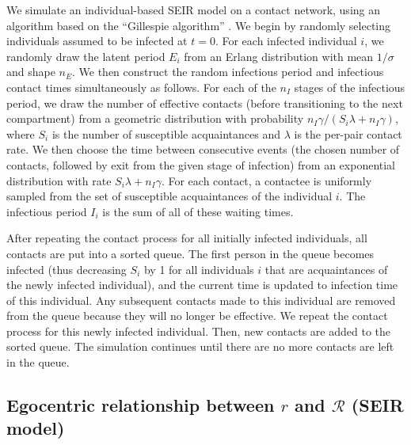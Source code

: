 \documentclass[12pt]{article}
\newcommand{\RR}{\ensuremath{{\mathcal R}}}
\begin{document}
We simulate an individual-based SEIR model on a contact network, using an algorithm based on the ``Gillespie algorithm'' \cite{bartlett1953stochastic,gillespie1977exact}.
We begin by randomly selecting individuals assumed to be infected at $t = 0$.
For each infected individual $i$, we randomly draw the latent period $E_i$ from an Erlang distribution with mean $1/\sigma$ and shape $n_E$.
We then construct the random infectious period and infectious contact times simultaneously as follows.
For each of the $n_I$ stages of the infectious period, we draw the number of effective contacts (before transitioning to the next compartment) from a geometric distribution with probability $n_I\gamma/(S_i \lambda + n_I \gamma)$, where $S_i$ is the number of susceptible acquaintances and $\lambda$ is the per-pair contact rate.
We then choose the time between consecutive events (the chosen number of contacts, followed by exit from the given stage of infection) from an exponential distribution with rate $S_i \lambda + n_I\gamma$.
For each contact, a contactee is uniformly sampled from the set of susceptible acquaintances of the individual $i$.
The infectious period $I_i$ is the sum of all of these waiting times.

After repeating the contact process for all initially infected individuals, all contacts are put into a sorted queue.
The first person in the queue becomes infected (thus decreasing $S_i$ by 1 for all individuals $i$ that are acquaintances of the newly infected individual), and the current time is updated to infection time of this individual. 
Any subsequent contacts made to this individual are removed from the queue because they will no longer be effective.
We repeat the contact process for this newly infected individual.
Then, new contacts are added to the sorted queue.
The simulation continues until there are no more contacts are left in the queue.

\subsection{Egocentric relationship between $r$ and $\RR$ (SEIR model)}
\label{egosection}
\end{document}
